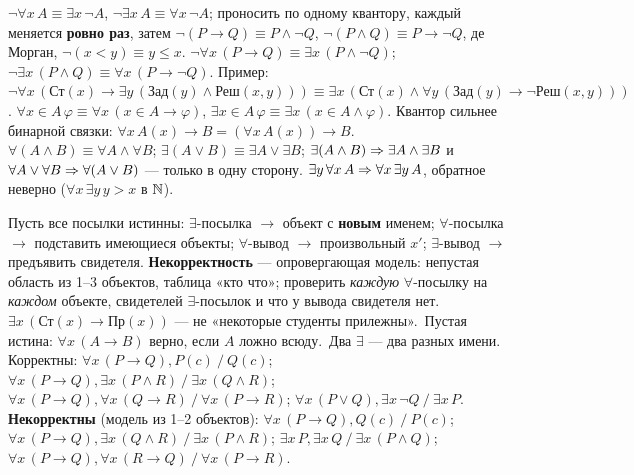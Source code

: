 { $\neg\forall x\,A\equiv\exists x\,\neg A$, $\neg\exists x\,A\equiv\forall x\,\neg A$; проносить по одному квантору, каждый меняется \textbf{ровно раз}, затем $\neg(P\to Q)\equiv P\wedge\neg Q$, $\neg(P\wedge Q)\equiv P\to\neg Q$, де Морган, $\neg(x<y)\equiv y\le x$. $\neg\forall x\,(P\to Q)\equiv\exists x\,(P\wedge\neg Q)$; $\neg\exists x\,(P\wedge Q)\equiv\forall x\,(P\to\neg Q)$. Пример: $\neg\forall x\,(\text{Ст}(x)\to\exists y\,(\text{Зад}(y)\wedge\text{Реш}(x,y)))\equiv\exists x\,(\text{Ст}(x)\wedge\forall y\,(\text{Зад}(y)\to\neg\text{Реш}(x,y)))$. $\forall x\in A\,\varphi\equiv\forall x\,(x\in A\to\varphi)$, $\exists x\in A\,\varphi\equiv\exists x\,(x\in A\wedge\varphi)$. Квантор сильнее бинарной связки: $\forall x\,A(x)\to B=(\forall x\,A(x))\to B$.\\
$\forall(A\wedge B)\equiv\forall A\wedge\forall B$; $\exists(A\vee B)\equiv\exists A\vee\exists B$; \trap $\exists(A\wedge B)\Rightarrow\exists A\wedge\exists B$ и $\forall A\vee\forall B\Rightarrow\forall(A\vee B)$ — только в одну сторону. $\exists y\,\forall x\,A\Rightarrow\forall x\,\exists y\,A$, обратное неверно ($\forall x\,\exists y\,y>x$ в $\mathbb{N}$).

 Пусть все посылки истинны: $\exists$-посылка $\to$ объект с \textbf{новым} именем; $\forall$-посылка $\to$ подставить имеющиеся объекты; $\forall$-вывод $\to$ произвольный $x'$; $\exists$-вывод $\to$ предъявить свидетеля. \textbf{Некорректность} — опровергающая модель: непустая область из 1–3 объектов, таблица «кто что»; проверить \emph{каждую} $\forall$-посылку на \emph{каждом} объекте, свидетелей $\exists$-посылок и что у вывода свидетеля нет.
\trap $\exists x\,(\text{Ст}(x)\to\text{Пр}(x))$ — не «некоторые студенты прилежны».\ \trap Пустая истина: $\forall x\,(A\to B)$ верно, если $A$ ложно всюду.\ \trap Два $\exists$ — два разных имени.\\
Корректны: $\forall x\,(P\to Q),P(c)\mathbin{/} Q(c)$; $\forall x\,(P\to Q),\exists x\,(P\wedge R)\mathbin{/}\exists x\,(Q\wedge R)$; $\forall x\,(P\to Q),\forall x\,(Q\to R)\mathbin{/}\forall x\,(P\to R)$; $\forall x\,(P\vee Q),\exists x\,\neg Q\mathbin{/}\exists x\,P$. \textbf{Некорректны} (модель из 1–2 объектов): $\forall x\,(P\to Q),Q(c)\mathbin{/} P(c)$; $\forall x\,(P\to Q),\exists x\,(Q\wedge R)\mathbin{/}\exists x\,(P\wedge R)$; $\exists x\,P,\exists x\,Q\mathbin{/}\exists x\,(P\wedge Q)$; $\forall x\,(P\to Q),\forall x\,(R\to Q)\mathbin{/}\forall x\,(P\to R)$.

}
